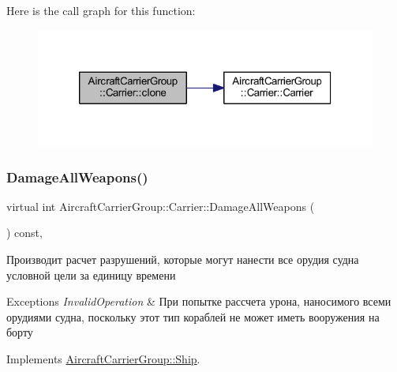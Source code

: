 Here is the call graph for this function\+:
\nopagebreak
\begin{figure}[H]
\begin{center}
\leavevmode
\includegraphics[width=320pt]{class_aircraft_carrier_group_1_1_carrier_acb567d5ef451d10187f46c34653626e1_cgraph}
\end{center}
\end{figure}
\mbox{\label{class_aircraft_carrier_group_1_1_carrier_a2829f08d60294321b5d06615d696864e}} 
\subsubsection{\texorpdfstring{Damage\+All\+Weapons()}{DamageAllWeapons()}}
{\footnotesize\ttfamily virtual int Aircraft\+Carrier\+Group\+::\+Carrier\+::\+Damage\+All\+Weapons (\begin{DoxyParamCaption}{ }\end{DoxyParamCaption}) const\hspace{0.3cm}{\ttfamily [inline]}, {\ttfamily [virtual]}}



Производит расчет разрушений, которые могут нанести все орудия судна условной цели за единицу времени 


\begin{DoxyExceptions}{Exceptions}
{\em Invalid\+Operation} & При попытке рассчета урона, наносимого всеми орудиями судна, поскольку этот тип кораблей не может иметь вооружения на борту \\
\hline
\end{DoxyExceptions}


Implements \mbox{\hyperlink{class_aircraft_carrier_group_1_1_ship_a025ad4bfa82e6ff5539d53ab899bd37f}{Aircraft\+Carrier\+Group\+::\+Ship}}.



